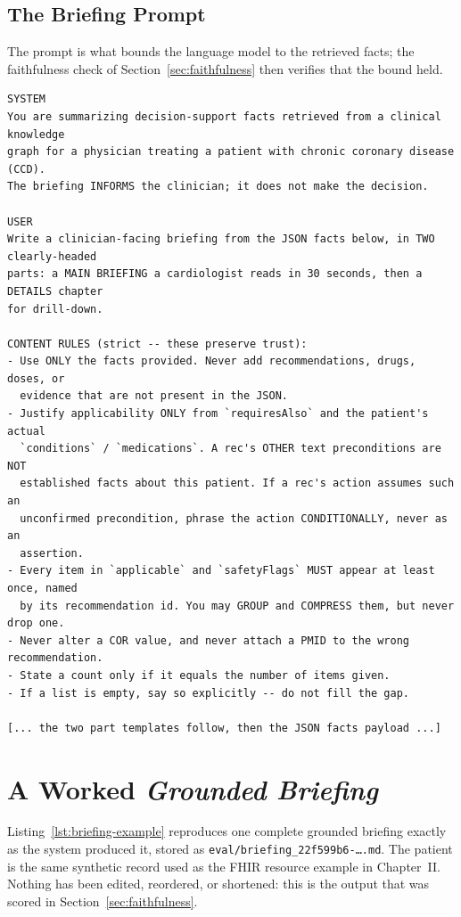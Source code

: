 \subsection{The Briefing Prompt}
The prompt is what bounds the language model to the retrieved facts; the faithfulness
check of Section~\ref{sec:faithfulness} then verifies that the bound held.

\begin{lstlisting}[caption={The grounded-briefing prompt (\texttt{crs\_briefing.py}), abridged.},label={lst:briefing-prompt}]
SYSTEM
You are summarizing decision-support facts retrieved from a clinical knowledge
graph for a physician treating a patient with chronic coronary disease (CCD).
The briefing INFORMS the clinician; it does not make the decision.

USER
Write a clinician-facing briefing from the JSON facts below, in TWO clearly-headed
parts: a MAIN BRIEFING a cardiologist reads in 30 seconds, then a DETAILS chapter
for drill-down.

CONTENT RULES (strict -- these preserve trust):
- Use ONLY the facts provided. Never add recommendations, drugs, doses, or
  evidence that are not present in the JSON.
- Justify applicability ONLY from `requiresAlso` and the patient's actual
  `conditions` / `medications`. A rec's OTHER text preconditions are NOT
  established facts about this patient. If a rec's action assumes such an
  unconfirmed precondition, phrase the action CONDITIONALLY, never as an
  assertion.
- Every item in `applicable` and `safetyFlags` MUST appear at least once, named
  by its recommendation id. You may GROUP and COMPRESS them, but never drop one.
- Never alter a COR value, and never attach a PMID to the wrong recommendation.
- State a count only if it equals the number of items given.
- If a list is empty, say so explicitly -- do not fill the gap.

[... the two part templates follow, then the JSON facts payload ...]
\end{lstlisting}


\section{A Worked \emph{Grounded Briefing}}
\label{app:briefing}

Listing~\ref{lst:briefing-example} reproduces one complete grounded briefing exactly as the
system produced it, stored as \texttt{eval/briefing\_22f599b6-\ldots.md}. The patient is the
same synthetic record used as the FHIR resource example in Chapter~II. Nothing has been
edited, reordered, or shortened: this is the output that was scored in
Section~\ref{sec:faithfulness}.

